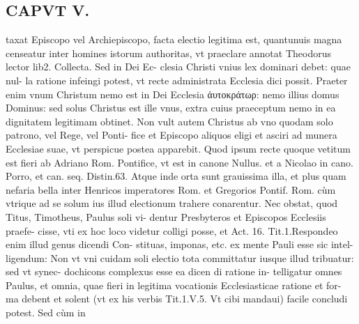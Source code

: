 \documentclass{article}
\begin{document}
\begin{pages}
\section*{CAPVT  V. }
\marginpar{[ p.347 ]}\pstart taxat Episcopo vel Archiepiscopo, facta electio legitima est, quantunuis magna censeatur inter homines istorum authoritas, vt praeclare annotat Theodorus lector lib2. Collecta. Sed in Dei Ec- clesia Christi vnius lex dominari debet: quae nul- la ratione infeingi potest, vt recte administrata Ecclesia dici possit. Praeter enim vnum Christum nemo est in Dei Ecclesia ἀυτοκράτωρ: nemo illius domus Dominus: sed solus Christus est ille vnus, extra cuius praeceptum nemo in ea dignitatem legitimam obtinet. Non vult autem Christus ab vno quodam solo patrono, vel Rege, vel Ponti- fice et Episcopo aliquos eligi et asciri ad munera Ecclesiae suae, vt perspicue postea apparebit. Quod ipsum recte quoque vetitum est fieri ab Adriano Rom. Pontifice, vt est in canone Nullus. et a Nicolao in cano. Porro, et can. seq. Distin.63. Atque  inde orta sunt grauissima illa, et plus quam nefaria bella inter Henricos imperatores Rom. et Gregorios Pontif. Rom. cùm vtrique ad se solum ius illud electionum trahere conarentur. Nec obstat, quod Titus, Timotheus, Paulus soli vi- dentur Presbyteros et Episcopos Ecclesiis praefe- cisse, vti ex hoc loco videtur colligi posse, et Act. 16. Tit.1.Respondeo enim illud genus dicendi Con- stituas, imponas, etc. ex mente Pauli esse sic intel- ligendum: Non vt vni cuidam soli electio tota committatur iusque illud tribuatur: sed vt synec- dochicons complexus esse ea dicen di ratione in- telligatur omnes Paulus, et omnia, quae fieri in legitima vocationis Ecclesiasticae ratione et for- ma debent et solent (vt ex his verbis Tit.1.V.5. Vt cibi mandaui) facile concludi potest. Sed cùm in  \pend

\end{pages}
\end{document}
